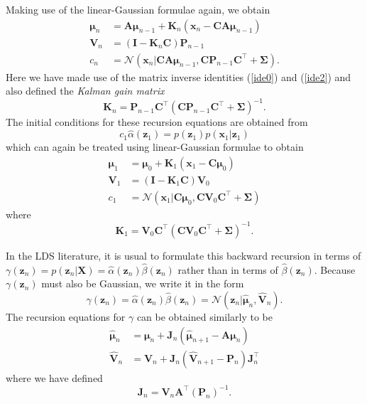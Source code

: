 \documentclass[a4paper]{book}
\renewcommand{\bf}{\mathbf}
\renewcommand{\cal}{\mathcal}
\newcommand{\imp}[1]{\textit{#1}}
\newcommand{\bs}{\boldsymbol}
\begin{document}
Making use of the linear-Gaussian formulae again, we obtain
\begin{align}
	\bs{\mu}_n &= \bf{A} \bs{\mu}_{n-1} + \bf{K}_n (\bf{x}_n - \bf{CA}\bs{\mu}_{n-1}) \\
	\bf{V}_n &= (\bf{I}-\bf{K}_n \bf{C})\bf{P}_{n-1} \\
	c_n &= \cal{N}(\bf{x}_n|\bf{CA}\bs{\mu}_{n-1},\bf{CP}_{n-1}\bf{C}^{\intercal} + \bs{\Sigma}).
\end{align}
Here we have made use of the matrix inverse identities (\ref{ide0}) and (\ref{ide2}) and also defined the \imp{Kalman gain matrix}
\begin{equation}
	\bf{K}_n = \bf{P}_{n-1} \bf{C}^{\intercal}(\bf{CP}_{n-1}\bf{C}^{\intercal} + \bs{\Sigma})^{-1}.
\end{equation}
The initial conditions for these recursion equations are obtained from
\begin{equation}
	c_1\hat{\alpha}(\bf{z}_1) = p(\bf{z}_1)p(\bf{x}_1|\bf{z}_1)
\end{equation}
which can again be treated using linear-Gaussian formulae to obtain
\begin{align}
	\bs{\mu}_1 &= \bs{\mu}_0 + \bf{K}_1 (\bf{x}_1-\bf{C}\bs{\mu}_0) \\
	\bf{V}_1 &= (\bf{I}-\bf{K}_1\bf{C})\bf{V}_0 \\
	c_1 &= \cal{N}(\bf{x}_1|\bf{C}\bs{\mu}_0,\bf{CV}_0\bf{C}^{\intercal}+\bs{\Sigma})
\end{align}
where
\begin{equation}
	\bf{K}_1 = \bf{V}_0\bf{C}^{\intercal}(\bf{CV}_0\bf{C}^{\intercal}+\bs{\Sigma})^{-1}.
\end{equation}

In the LDS literature, it is usual to formulate this backward recursion in terms of $\gamma(\bf{z}_n) = p(\bf{z}_n|\bf{X})= \hat{\alpha}(\bf{z}_n)\hat{\beta}(\bf{z}_n)$ rather than in terms of $\hat{\beta}(\bf{z}_n)$. Because $\gamma(\bf{z}_n)$ must also be Gaussian, we write it in the form
\begin{equation}
	\gamma(\bf{z}_n) = \hat{\alpha}(\bf{z}_n)\hat{\beta}(\bf{z}_n)=\cal{N}(\bf{z}_n|\hat{\bs{\mu}}_n,\hat{\bf{V}}_n).
\end{equation}
The recursion equations for $\gamma$ can be obtained similarly to be
\begin{align}
	\hat{\bs{\mu}}_n &= \bs{\mu}_n + \bf{J}_n (\hat{\bs{\mu}}_{n+1}-\bf{A}\bs{\mu}_n) \\
	\hat{\bf{V}}_n &= \bf{V}_n + \bf{J}_n(\hat{\bf{V}}_{n+1}-\bf{P}_n)\bf{J}_n^{\intercal}
\end{align}
where we have defined
\begin{equation}
	\bf{J}_n = \bf{V}_n \bf{A}^{\intercal} (\bf{P}_n)^{-1}.
\end{equation}
\end{document}
